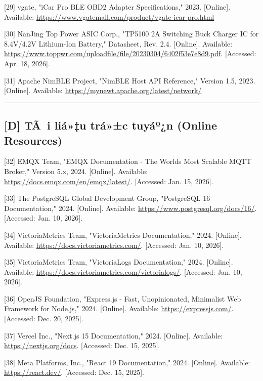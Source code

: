 \documentclass[a4paper]{extarticle}
\begin{document}
{[}29{]} vgate, "iCar Pro BLE OBD2 Adapter Specifications," 2023.
{[}Online{]}. Available:
\url{https://www.vgatemall.com/product/vgate-icar-pro.html}

{[}30{]} NanJing Top Power ASIC Corp., "TP5100 2A Switching Buck Charger
IC for 8.4V/4.2V Lithium-Ion Battery," Datasheet, Rev. 2.4. {[}Online{]}. Available:
\url{https://www.toppwr.com/uploadfile/file/20230304/6402f53e7e8d9.pdf}. {[}Accessed: Apr. 18, 2026{]}.

{[}31{]} Apache NimBLE Project, "NimBLE Host API Reference," Version
1.5, 2023. {[}Online{]}. Available:
\url{https://mynewt.apache.org/latest/network/}

\begin{center}\rule{0.5\linewidth}{0.5pt}\end{center}

\subsection{{[}D{]} TÃ i liá»‡u trá»±c tuyáº¿n (Online
Resources)}\label{d-tuxe0i-liux1ec7u-trux1ef1c-tuyux1ebfn-online-resources}

{[}32{]} EMQX Team, "EMQX Documentation - The World\textquotesingle s
Most Scalable MQTT Broker," Version 5.x, 2024. {[}Online{]}. Available:
\url{https://docs.emqx.com/en/emqx/latest/}. {[}Accessed: Jan. 15,
2026{]}.

{[}33{]} The PostgreSQL Global Development Group, "PostgreSQL 16
Documentation," 2024. {[}Online{]}. Available:
\url{https://www.postgresql.org/docs/16/}. {[}Accessed: Jan. 10,
2026{]}.

{[}34{]} VictoriaMetrics Team, "VictoriaMetrics Documentation," 2024.
{[}Online{]}. Available: \url{https://docs.victoriametrics.com/}.
{[}Accessed: Jan. 10, 2026{]}.

{[}35{]} VictoriaMetrics Team, "VictoriaLogs Documentation," 2024.
{[}Online{]}. Available:
\url{https://docs.victoriametrics.com/victorialogs/}. {[}Accessed: Jan.
10, 2026{]}.

{[}36{]} OpenJS Foundation, "Express.js - Fast, Unopinionated,
Minimalist Web Framework for Node.js," 2024. {[}Online{]}. Available:
\url{https://expressjs.com/}. {[}Accessed: Dec. 20, 2025{]}.

{[}37{]} Vercel Inc., "Next.js 15 Documentation," 2024. {[}Online{]}.
Available: \url{https://nextjs.org/docs}. {[}Accessed: Dec. 15, 2025{]}.

{[}38{]} Meta Platforms, Inc., "React 19 Documentation," 2024.
{[}Online{]}. Available: \url{https://react.dev/}. {[}Accessed: Dec. 15,
2025{]}.
\end{document}
